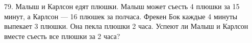 79. Малыш и Карлсон едят плюшки. Малыш может съесть 4 плюшки за 15 минут, а Карлсон --- 16 плюшек за полчаса. Фрекен Бок каждые 4 минуты выпекает 3 плюшки. Она пекла плюшки 2 часа. Успеют ли Малыш и Карлсон вместе съесть все плюшки за 2 часа?\\
